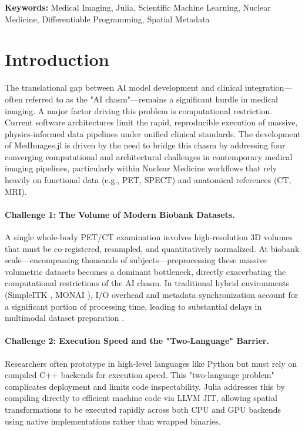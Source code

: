 \documentclass[10pt,letterpaper]{article}
\begin{document}
\textbf{Keywords:} Medical Imaging, Julia, Scientific Machine Learning, Nuclear Medicine, Differentiable Programming, Spatial Metadata

\section{Introduction}

The translational gap between AI model development and clinical integration---often referred to as the "AI chasm"---remains a significant hurdle in medical imaging. A major factor driving this problem is computational restriction. Current software architectures limit the rapid, reproducible execution of massive, physics-informed data pipelines under unified clinical standards. The development of MedImages.jl is driven by the need to bridge this chasm by addressing four converging computational and architectural challenges in contemporary medical imaging pipelines, particularly within Nuclear Medicine workflows that rely heavily on functional data (e.g., PET, SPECT) and anatomical references (CT, MRI).

\paragraph{Challenge 1: The Volume of Modern Biobank Datasets.}
A single whole-body PET/CT examination involves high-resolution 3D volumes that must be co-registered, resampled, and quantitatively normalized. At biobank scale---encompassing thousands of subjects---preprocessing these massive volumetric datasets becomes a dominant bottleneck, directly exacerbating the computational restrictions of the AI chasm. In traditional hybrid environments (SimpleITK \cite{LowekampChen2013}, MONAI \cite{CardosoLi2022}), I/O overhead and metadata synchronization account for a significant portion of processing time, leading to substantial delays in multimodal dataset preparation \cite{Dexl_2025}.

\paragraph{Challenge 2: Execution Speed and the "Two-Language" Barrier.}
Researchers often prototype in high-level languages like Python but must rely on compiled C++ backends for execution speed. This "two-language problem" complicates deployment and limits code inspectability. Julia \cite{BezansonChen2018} addresses this by compiling directly to efficient machine code via LLVM JIT, allowing spatial transformations to be executed rapidly across both CPU and GPU backends using native implementations rather than wrapped binaries.
\end{document}

